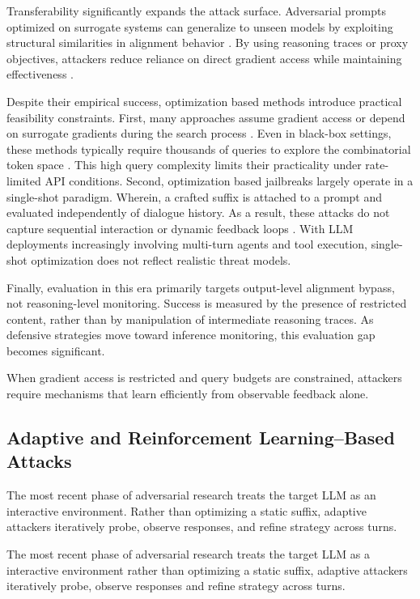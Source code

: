\documentclass[conference]{IEEEtran}
\begin{document}
Transferability significantly expands the attack surface. Adversarial prompts optimized on surrogate systems can generalize to unseen models by exploiting structural similarities in alignment behavior \cite{b11}. By using reasoning traces or proxy objectives, attackers reduce reliance on direct gradient access while maintaining effectiveness \cite{b11}.

Despite their empirical success, optimization based methods introduce practical feasibility constraints. First, many approaches assume gradient access or depend on surrogate gradients during the search process \cite{b10}. Even in black-box settings, these methods typically require thousands of queries to explore the combinatorial token space \cite{b2}. This high query complexity limits their practicality under rate-limited API conditions.
Second, optimization based jailbreaks largely operate in a single-shot paradigm. Wherein, a crafted suffix is attached to a prompt and evaluated independently of dialogue history. As a result, these attacks do not capture sequential interaction or dynamic feedback loops \cite{b3,b4}. With LLM deployments increasingly involving multi-turn agents and tool execution, single-shot optimization does not reflect realistic threat models.

Finally, evaluation in this era primarily targets output-level alignment bypass, not reasoning-level monitoring. Success is measured by the presence of restricted content, rather than by manipulation of intermediate reasoning traces. As defensive strategies move toward inference monitoring, this evaluation gap becomes significant.

When gradient access is restricted and query budgets are constrained, attackers require mechanisms that learn efficiently from observable feedback alone.

\subsection{Adaptive and Reinforcement Learning--Based Attacks}

The most recent phase of adversarial research treats the target LLM as an interactive environment. Rather than optimizing a static suffix, adaptive attackers iteratively probe, observe responses, and refine strategy across turns.

The most recent phase of adversarial research treats the target LLM as a interactive environment rather than optimizing a static suffix, adaptive attackers iteratively probe, observe responses and refine strategy across turns.
\end{document}
